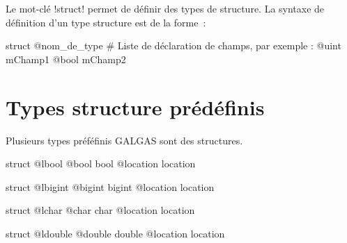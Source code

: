 


Le mot-clé \ggs!struct! permet de définir des types de structure. La syntaxe de définition d'un type structure est de la forme~:

\begin{galgas}
struct @nom_de_type
  # Liste de déclaration de champs, par exemple :
  @uint mChamp1
  @bool mChamp2
\end{galgas}


\section{Types structure prédéfinis}

Plusieurs types préféfinis GALGAS sont des structures.
 

\begin{galgas}
struct @lbool {
  @bool bool
  @location location
}
\end{galgas}
 

\begin{galgas}
struct @lbigint {
  @bigint bigint
  @location location
}
\end{galgas}





\begin{galgas}
struct @lchar {
  @char char
  @location location
}
\end{galgas}








\begin{galgas}
struct @ldouble {
  @double double
  @location location
}
\end{galgas}








